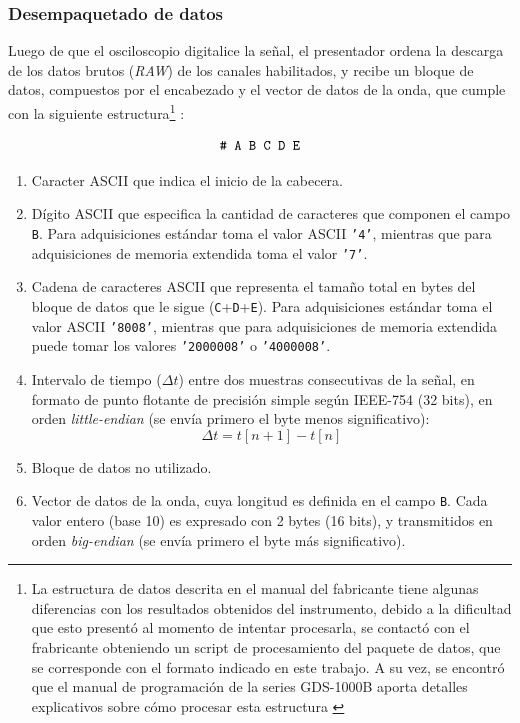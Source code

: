 \subsubsection{Desempaquetado de datos}
\label{subsec:desempaquetado_datos}

Luego de que el osciloscopio digitalice la señal, el presentador ordena la descarga de los datos brutos (\emph{RAW}) de los canales habilitados, y recibe un bloque de datos, compuestos por el encabezado y el vector de datos de la onda, que cumple con la siguiente estructura\footnote{La estructura de datos descrita en el manual del fabricante tiene algunas diferencias con los resultados obtenidos del instrumento, debido a la dificultad que esto presentó al momento de intentar procesarla, se contactó con el frabricante obteniendo un script de procesamiento del paquete de datos, que se corresponde con el formato indicado en este trabajo. A su vez, se encontró que el manual de programación de la series GDS-1000B aporta detalles explicativos sobre cómo procesar esta estructura \cite{gds1000b_ProgrammingManual}} \cite{gds1000au_ProgrammingManual}:

\begin{equation*}\label{eq:formato_memoria}
\text{\texttt{\# A B C D E}}
\end{equation*}
\begin{enumerate}
    \item[\texttt{\#:}] [\num{1} byte] Caracter ASCII que indica el inicio de la cabecera.
    \item[\texttt{A:}] [\num{1} byte] Dígito ASCII que especifica la cantidad de caracteres que componen el campo \texttt{B}. Para adquisiciones estándar toma el valor ASCII \texttt{'4'}, mientras que para adquisiciones de memoria extendida toma el valor \texttt{'7'}.
    \item[\texttt{B:}] [\num{4} o \num{7} bytes] Cadena de caracteres ASCII que representa el tamaño total en bytes del bloque de datos que le sigue (\texttt{C}+\texttt{D}+\texttt{E}).
    Para adquisiciones estándar toma el valor ASCII \texttt{'8008'}, mientras que para adquisiciones de memoria extendida puede tomar los valores \texttt{'2000008'} o \texttt{'4000008'}.
    \item[\texttt{C:}] [\num{4} bytes] Intervalo de tiempo ($\Delta t$) entre dos muestras consecutivas de la señal, en formato de punto flotante de precisión simple según IEEE-754 (\num{32} bits), en orden \emph{little-endian} (se envía primero el byte menos significativo):
    \begin{equation*}\label{eq:periodo_muestreo}
    \Delta t = t[n+1] - t[n]
    \end{equation*}
    \item[\texttt{D:}] [\num{4} bytes] Bloque de datos no utilizado.
    \item[\texttt{E:}] [\num{8e3}, \num{2e6} o \num{4e6} bytes] Vector de datos de la onda, cuya longitud es definida en el campo \texttt{B}. Cada valor entero (base \num{10}) es expresado con \num{2} bytes (\num{16} bits), y transmitidos en orden \emph{big-endian} (se envía primero el byte más significativo).
\end{enumerate}

